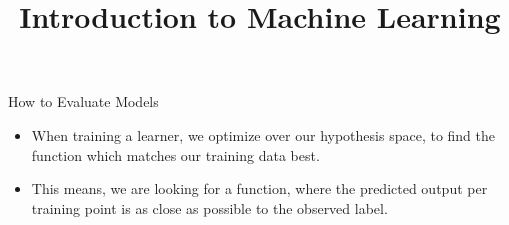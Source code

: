 \documentclass[11pt,compress,t,notes=noshow, xcolor=table]{beamer}
\title{Introduction to Machine Learning}
\begin{document}


\begin{vbframe}{How to Evaluate Models}

\begin{itemize}
\item When training a learner, we optimize over our hypothesis space,
    to find the function which matches our training data best.
\item This means, we are looking for a function, where the 
    predicted output per training point is as close as possible to
    the observed label.
\end{itemize}






\end{vbframe}
\end{document}
